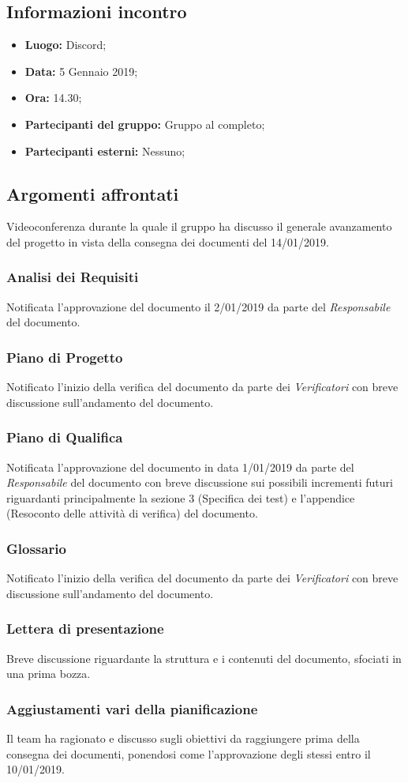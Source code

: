 \subsection{Informazioni incontro}
\begin{itemize}
	\item { \textbf{Luogo:} Discord;  }
	\item { \textbf{Data:} 5 Gennaio 2019; }
	\item { \textbf{Ora:} 14.30; }
	\item { \textbf{Partecipanti del gruppo:} Gruppo al completo;}
	\item { \textbf{Partecipanti esterni:} Nessuno; }
\end{itemize}


\subsection{Argomenti affrontati}
Videoconferenza durante la quale il gruppo ha discusso il generale avanzamento del progetto in vista della consegna dei documenti del 14/01/2019.

\subsubsection{Analisi dei Requisiti}
Notificata l'approvazione del documento il 2/01/2019 da parte del \emph{Responsabile} del documento.
\subsubsection{Piano di Progetto}
Notificato l'inizio della verifica del documento da parte dei \emph{Verificatori} con breve discussione sull'andamento del documento.
\subsubsection{Piano di Qualifica}
Notificata l'approvazione del documento in data 1/01/2019 da parte del \emph{Responsabile} del documento con breve discussione sui possibili incrementi futuri riguardanti principalmente la sezione 3 (Specifica dei test) e l'appendice (Resoconto delle attività di verifica) del documento.
\subsubsection{Glossario}
Notificato l'inizio della verifica del documento da parte dei \emph{Verificatori} con breve discussione sull'andamento del documento.
\subsubsection{Lettera di presentazione}
Breve discussione riguardante la struttura e i contenuti del documento, sfociati in una prima bozza.
\subsubsection{Aggiustamenti vari della pianificazione}
Il team ha ragionato e discusso sugli obiettivi da raggiungere prima della consegna dei documenti, ponendosi come  l'approvazione degli stessi entro il 10/01/2019. 
